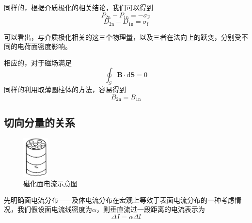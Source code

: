 			同样的，根据介质极化的相关结论，我们可以得到
			\begin{equation}
				P_{2 \mathrm{n}}-P_{1 \mathrm{n}}=-\sigma_{\mathrm{P}}
			\end{equation}
			\begin{equation}
				D_{2 \mathrm{n}}-D_{1 \mathrm{n}}=\sigma_{\mathrm{f}}
			\end{equation}

			可以看出，与介质极化相关的这三个物理量，以及三者在法向上的跃变，分别受不同的电荷面密度影响。

			相应的，对于磁场满足
			\begin{equation}
				\oint_{S} \boldsymbol{B} \cdot \mathrm{d} \boldsymbol{S}=0
			\end{equation}
			同样的利用取薄圆柱体的方法，容易得到
			\begin{equation}
				B_{2 \mathrm{n}}=B_{1 \mathrm{n}}
			\end{equation}
		\subsection{切向分量的关系}
		\begin{figure}%
	      \centering
	      \includegraphics[width=0.12\textwidth]{figs/磁化面电流示意图.jpg}
	      \caption{磁化面电流示意图}
	      \end{figure}
			先明确面电流分布——及体电流分布在宏观上等效于表面电流分布的一种考虑情况，我们假设面电流线密度为$\alpha$，则垂直流过一段距离的电流表示为
			\begin{equation}
				\Delta I=\alpha \Delta l
			\end{equation}





		













